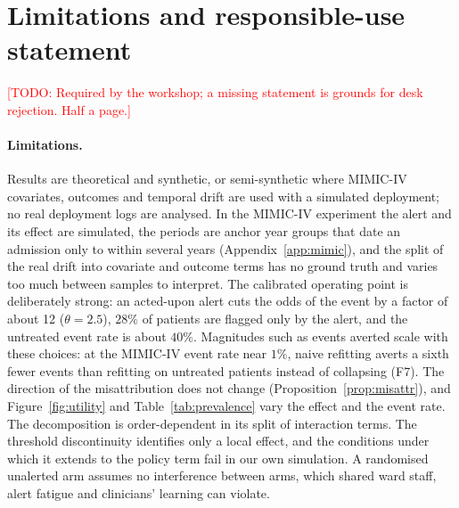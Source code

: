 \documentclass[letterpaper]{article} %
\newcommand{\todo}[1]{\textcolor{red}{[TODO: #1]}}
\begin{document}
\section{Limitations and responsible-use statement}
\label{sec:responsible}

\todo{Required by the workshop; a missing statement is grounds for desk
rejection. Half a page.}

\paragraph{Limitations.} Results are theoretical and synthetic, or
semi-synthetic where MIMIC-IV covariates, outcomes and temporal drift are used
with a simulated deployment; no real deployment logs are analysed. In the
MIMIC-IV experiment the alert and its effect are simulated, the periods are
anchor year groups that date an admission only to within several years
(Appendix~\ref{app:mimic}), and the split of the real drift into covariate and
outcome terms has no ground truth and varies too much between samples to
interpret. The calibrated
operating point is deliberately strong: an acted-upon alert cuts the odds of
the event by a factor of about 12 ($\theta = 2.5$), $28\%$ of patients are
flagged only by the alert, and the untreated event rate is about $40\%$.
Magnitudes such as events averted scale with these choices: at the MIMIC-IV
event rate near $1\%$, naive refitting averts a sixth fewer events than
refitting on untreated patients instead of collapsing (F7). The direction of the misattribution does not change
(Proposition~\ref{prop:misattr}), and
Figure~\ref{fig:utility} and Table~\ref{tab:prevalence} vary the effect and the
event rate. The decomposition is order-dependent in its split of interaction
terms. The threshold discontinuity identifies only a local effect, and the
conditions under which it extends to the policy term fail in our own
simulation. A randomised unalerted arm assumes no interference between arms,
which shared ward staff, alert fatigue and clinicians' learning can violate.
\end{document}
